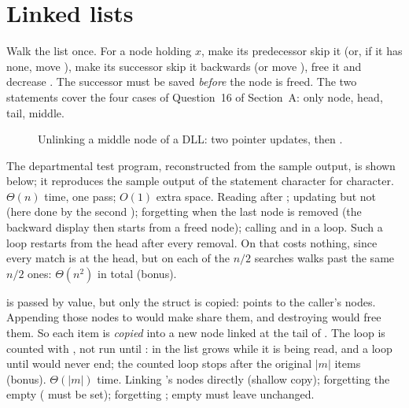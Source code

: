 \section{Linked lists}

\idea Walk the list once. For a node  holding $x$, make its predecessor skip it
(or, if it has none, move ), make its successor skip it backwards (or move
), free it and decrease . The successor must be saved \emph{before} the
node is freed. The two  statements cover the four cases of Question~16 of
Section~A: only node, head, tail, middle.

\begin{figure}[ht]\centering
{}
\caption{Unlinking a middle node of a DLL: two pointer updates, then .}
\end{figure}

The departmental test program, reconstructed from the sample output, is shown below; it
reproduces the sample output of the statement character for character.
\complexity $\Theta(n)$ time, one pass; $O(1)$ extra space.
\mistakes Reading  after ; updating  but not
 (here done by the second ); forgetting  when the last node
is removed (the backward display then starts from a freed node); calling  and
 in a loop. Such a loop restarts from the head after every removal. On
 that costs nothing, since every match is at the head, but on
 each of the $n/2$ searches walks past the same $n/2$ ones:
$\Theta(n^2)$ in total (bonus).

\idea {} is passed by value, but only the struct is copied:  points to the
caller's nodes. Appending those nodes to  would make  share them, and
destroying  would free them. So each item is \emph{copied} into a new node linked
at the tail of . The loop is counted with , not run until :
in  the list grows while it is being read, and a loop until
 would never end; the counted loop stops after the original $|m|$ items (bonus).
\complexity $\Theta(|m|)$ time.
\mistakes Linking 's nodes directly (shallow copy); forgetting the empty 
( must be set); forgetting ; empty  must leave  unchanged.

